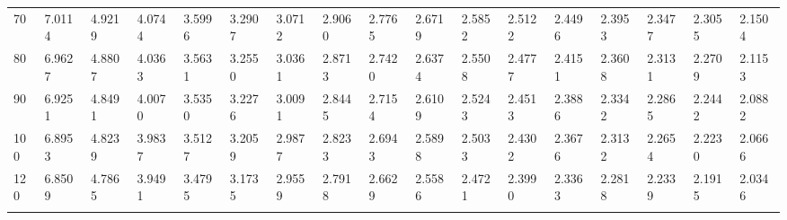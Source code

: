 {\begin{tabular}{|m{8pt}|m{18pt}*{15}{m{18pt}}}
 70 & 7.0114 & 4.9219 & 4.0744 & 3.5996 & 3.2907 & 3.0712 & 2.9060 & 2.7765 & 2.6719 & 2.5852 & 2.5122 & 2.4496 & 2.3953 & 2.3477 & 2.3055 & 2.1504 \\[2pt] \arrayrulecolor{light-gray}\hline\arrayrulecolor{black}  
 80 & 6.9627 & 4.8807 & 4.0363 & 3.5631 & 3.2550 & 3.0361 & 2.8713 & 2.7420 & 2.6374 & 2.5508 & 2.4777 & 2.4151 & 2.3608 & 2.3131 & 2.2709 & 2.1153 \\[2pt] \arrayrulecolor{light-gray}\hline\arrayrulecolor{black}  
 90 & 6.9251 & 4.8491 & 4.0070 & 3.5350 & 3.2276 & 3.0091 & 2.8445 & 2.7154 & 2.6109 & 2.5243 & 2.4513 & 2.3886 & 2.3342 & 2.2865 & 2.2442 & 2.0882 \\[2pt] \arrayrulecolor{light-gray}\hline\arrayrulecolor{black}  
100 & 6.8953 & 4.8239 & 3.9837 & 3.5127 & 3.2059 & 2.9877 & 2.8233 & 2.6943 & 2.5898 & 2.5033 & 2.4302 & 2.3676 & 2.3132 & 2.2654 & 2.2230 & 2.0666 \\[2pt] \arrayrulecolor{light-gray}\hline\arrayrulecolor{black}  
120 & 6.8509 & 4.7865 & 3.9491 & 3.4795 & 3.1735 & 2.9559 & 2.7918 & 2.6629 & 2.5586 & 2.4721 & 2.3990 & 2.3363 & 2.2818 & 2.2339 & 2.1915 & 2.0346 \\[2pt] \arrayrulecolor{light-gray}\hline\arrayrulecolor{black}  
\end{tabular}}
